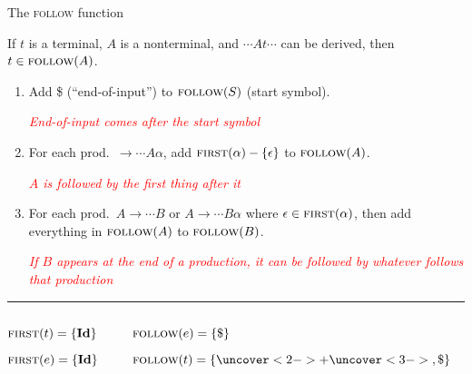 \documentclass{plt}
\begin{document}
\begin{frame}{The \textsc{follow} function}

If $t$ is a terminal, $A$ is a nonterminal, and $\cdots A t \cdots$
can be derived, then $t \in \textsc{follow}(A)$.

\begin{enumerate}
\item Add \$ (``end-of-input'') to $\textsc{follow}(S)$ (start symbol).

  \textcolor{red}{\emph{End-of-input comes after the start symbol}}

\item For each prod.\ $\rightarrow \cdots A \alpha$, add
  $\textsc{first}(\alpha) - \{ \epsilon \}$ to $\textsc{follow}(A)$.

  \textcolor{red}{\emph{$A$ is followed by the first thing after it}}

\item For each prod.\ $A \rightarrow \cdots B$ or $A \rightarrow
  \cdots B \alpha$ where $\epsilon \in \textsc{first}(\alpha)$, then add
  everything in $\textsc{follow}(A)$ to $\textsc{follow}(B)$.

  \textcolor{red}{\emph{If $B$ appears at the end of a production, it
      can be followed by whatever follows that production}}

\end{enumerate}

\hrule

\vspace{5pt}

\begin{columns}
\begin{column}[t]{0.3\textwidth}
\grammarone

$\textsc{first}(t) = \{\textbf{Id}\}$

$\textsc{first}(e) = \{\textbf{Id}\}$
\end{column}
\begin{column}[t]{0.7\textwidth}
$\textsc{follow}(e) = \{ \$ \}$

$\follow(t) = \{ \uncover<2->{+} \uncover<3->{, \$} \}$

\medskip

%
%
%

\end{column}
\end{columns}

\end{frame}
\end{document}

